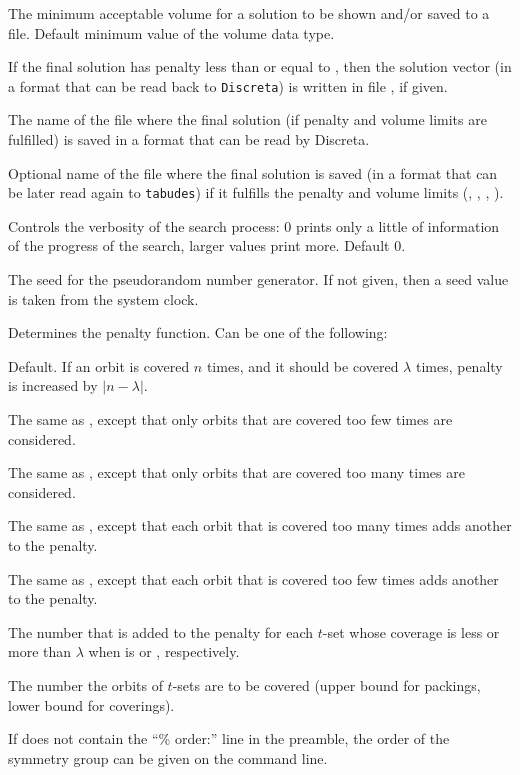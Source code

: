 \documentclass[12pt,a4paper]{article}
\begin{document}
\begin{owndescription}
\item[\Var{minvol}] The minimum acceptable volume for a solution to
  be shown and/or saved to a file. Default minimum value of the
  volume data type.
\item[\Var{discretapenalty}] If the final solution has penalty less
  than or equal to , then the solution vector (in
  a format that can be read back to \texttt{Discreta}) is written in
  file , if given.
\item[\Var{discretaoutput}] The name of the file where the final
  solution (if penalty and volume limits are fulfilled) is saved in
  a format that can be read by Discreta.
\item[\Var{outfile}] Optional name of the file where the final solution is
  saved (in a format that can be later read again to \texttt{tabudes})
  if it fulfills the penalty and volume limits (,
  , , ).
\item[\Var{verbose}] Controls the verbosity of the search process: 0
  prints only a little of information of the progress of the search,
  larger values print more. Default 0.
\item[\Var{seed}] The seed for the pseudorandom number generator. If
  not given, then a seed value is taken from the system clock.
\item[\Var{coverpenalty}] Determines the penalty function. Can be one
  of the following:
  \begin{owndescription}
  \item[\Val{design}] Default. If an orbit is covered $n$ times, and
    it should be covered $\lambda$ times, penalty is increased by
    $\left| n - \lambda \right|$.
  \item[\Val{cover}] The same as , except that only orbits
    that are covered too few times are considered.
  \item[\Val{pack}] The same as , except that only orbits
    that are covered too many times are considered.
  \item[\Val{asymhigh}] The same as , except that each orbit
    that is covered too many times adds another  to the
    penalty.
  \item[\Val{asymlow}] The same as , except that each orbit
    that is covered too few times adds another  to the
    penalty.
  \end{owndescription}
\item[\Var{asymadd}] The number that is added to the penalty for each
  $t$-set whose coverage is less or more than $\lambda$ when
   is  or , respectively.
\item[\Var{lambda}] The number the orbits of $t$-sets are to be
  covered (upper bound for packings, lower bound for coverings).
\item[\Var{order}] If  does not contain the ``\%
  order:'' line in the preamble, the order of the symmetry group can
  be given on the command line.
\end{owndescription}
\end{document}
